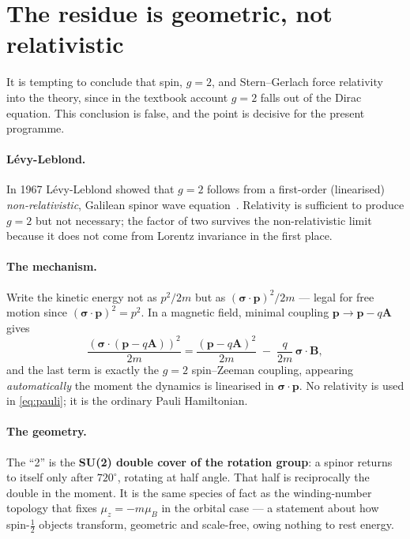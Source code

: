 \documentclass[11pt]{article}
\begin{document}
\section{The residue is geometric, not relativistic}
\label{sec:geom}

It is tempting to conclude that spin, $g=2$, and Stern--Gerlach force relativity into the theory, since in
the textbook account $g=2$ falls out of the Dirac equation. This conclusion is false, and the point is
decisive for the present programme.

\paragraph{Lévy-Leblond.} In 1967 Lévy-Leblond showed that $g=2$ follows from a first-order (linearised)
\emph{non-relativistic}, Galilean spinor wave equation~\cite{LevyLeblond}. Relativity is sufficient to
produce $g=2$ but not necessary; the factor of two survives the non-relativistic limit because it does not
come from Lorentz invariance in the first place.

\paragraph{The mechanism.} Write the kinetic energy not as $p^2/2m$ but as
$(\boldsymbol\sigma\cdot\mathbf p)^2/2m$ --- legal for free motion since
$(\boldsymbol\sigma\cdot\mathbf p)^2 = p^2$. In a magnetic field, minimal coupling
$\mathbf p\to\mathbf p-q\mathbf A$ gives
\begin{equation}
\frac{(\boldsymbol\sigma\cdot(\mathbf p-q\mathbf A))^2}{2m}
= \frac{(\mathbf p-q\mathbf A)^2}{2m} \;-\; \frac{q}{2m}\,\boldsymbol\sigma\cdot\mathbf B ,
\label{eq:pauli}
\end{equation}
and the last term is exactly the $g=2$ spin--Zeeman coupling, appearing \emph{automatically} the moment
the dynamics is linearised in $\boldsymbol\sigma\cdot\mathbf p$. No relativity is used in
\eqref{eq:pauli}; it is the ordinary Pauli Hamiltonian.

\paragraph{The geometry.} The ``2'' is the \textbf{SU(2) double cover of the rotation group}: a spinor
returns to itself only after $720^\circ$, rotating at half angle. That half is reciprocally the double in
the moment. It is the same species of fact as the winding-number topology that fixes $\mu_z=-m\mu_B$ in
the orbital case --- a statement about how spin-$\tfrac12$ objects transform, geometric and
scale-free, owing nothing to rest energy.
\end{document}
